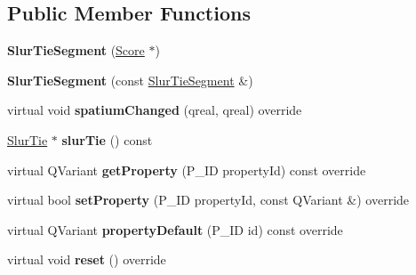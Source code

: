 \subsection*{Public Member Functions}
\begin{DoxyCompactItemize}
\item 
\mbox{\label{class_ms_1_1_slur_tie_segment_a3512b40969421d4fbf30b26a7c4e6686}} 
{\bfseries Slur\+Tie\+Segment} (\hyperlink{class_ms_1_1_score}{Score} $\ast$)
\item 
\mbox{\label{class_ms_1_1_slur_tie_segment_a32d73a90d81528cb241d6d7afde7d02d}} 
{\bfseries Slur\+Tie\+Segment} (const \hyperlink{class_ms_1_1_slur_tie_segment}{Slur\+Tie\+Segment} \&)
\item 
\mbox{\label{class_ms_1_1_slur_tie_segment_a5b304316f0e6b305f1b95812e6c70490}} 
virtual void {\bfseries spatium\+Changed} (qreal, qreal) override
\item 
\mbox{\label{class_ms_1_1_slur_tie_segment_a8e9f6b4a411ebf5b17d13502fcd1660b}} 
\hyperlink{class_ms_1_1_slur_tie}{Slur\+Tie} $\ast$ {\bfseries slur\+Tie} () const
\item 
\mbox{\label{class_ms_1_1_slur_tie_segment_a623c51ff248cbc934e1f56af8c517167}} 
virtual Q\+Variant {\bfseries get\+Property} (P\+\_\+\+ID property\+Id) const override
\item 
\mbox{\label{class_ms_1_1_slur_tie_segment_ae10d230f903687c3a7e3b040d325d04d}} 
virtual bool {\bfseries set\+Property} (P\+\_\+\+ID property\+Id, const Q\+Variant \&) override
\item 
\mbox{\label{class_ms_1_1_slur_tie_segment_ad3916a99c9fa2f9bae9ed1b62dceee78}} 
virtual Q\+Variant {\bfseries property\+Default} (P\+\_\+\+ID id) const override
\item 
\mbox{\label{class_ms_1_1_slur_tie_segment_af7f758b653c9ac9d64e4d5c24af8c894}} 
virtual void {\bfseries reset} () override
\item 
\mbox{\label{class_ms_1_1_slur_tie_segment_a2b5e04c0f99565d74613fc10ae836234}} 

\end{DoxyCompactItemize}
